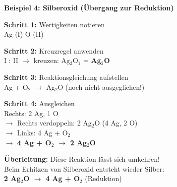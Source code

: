 \documentclass[11pt, a4paper]{article}
\newcommand{\abschnitt}[1]{%
    \vspace{10pt}%
    \noindent{\large\bfseries\textcolor{fachfarbe}{#1}}%
    \vspace{6pt}%
    \nopagebreak[4]%
}
\begin{document}
\newpage

\begin{loesungbox}
\textbf{Beispiel 4: Silberoxid (Übergang zur Reduktion)}

\textbf{Schritt 1:} Wertigkeiten notieren\\
Ag (I) \quad O (II)

\textbf{Schritt 2:} Kreuzregel anwenden\\
I : II $\rightarrow$ kreuzen: Ag$_2$O$_1$ = \textbf{Ag$_2$O}

\textbf{Schritt 3:} Reaktionsgleichung aufstellen\\
Ag + O$_2$ $\rightarrow$ Ag$_2$O \quad (noch nicht ausgeglichen!)

\textbf{Schritt 4:} Ausgleichen\\
Rechts: 2 Ag, 1 O\\
$\rightarrow$ Rechts verdoppeln: 2 Ag$_2$O (4 Ag, 2 O)\\
$\rightarrow$ Links: 4 Ag + O$_2$\\
$\rightarrow$ \textbf{4 Ag + O$_2$ $\rightarrow$ 2 Ag$_2$O}

\vspace{0.5em}
\textcolor{fachfarbe}{\textbf{Überleitung:}} Diese Reaktion lässt sich umkehren!\\
Beim Erhitzen von Silberoxid entsteht wieder Silber:\\
\textbf{2 Ag$_2$O $\rightarrow$ 4 Ag + O$_2$} \quad (Reduktion)
\end{loesungbox}

\vspace{1em}


\abschnitt{Häufige Fehler}
\end{document}
